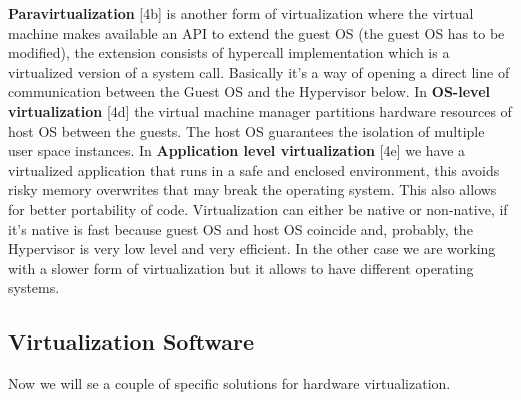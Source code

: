 \miniSpace
\textbf{Paravirtualization} [4b] is another form of virtualization where the virtual machine makes available an API to extend the guest OS (the guest OS has to be modified), the extension consists of hypercall implementation which is a virtualized version of a system call. Basically it's a way of opening a direct line of communication between the Guest OS and the Hypervisor below. \n
\miniSpace
In \textbf{OS-level virtualization} [4d] the virtual machine manager partitions hardware resources of host OS between the guests. The host OS guarantees the isolation of multiple user space instances. \n
\miniSpace
In \textbf{Application level virtualization} [4e] we have a virtualized application that runs in a safe and enclosed environment, this avoids risky memory overwrites that may break the operating system. This also allows for better portability of code. \n
\smallSpace
Virtualization can either be native or non-native, if it's native is fast because guest OS and host OS coincide and, probably, the Hypervisor is very low level and very efficient. In the other case we are working with a slower form of virtualization but it allows to have different operating systems. \n

\subsection{Virtualization Software}
Now we will se a couple of specific solutions for hardware virtualization.
